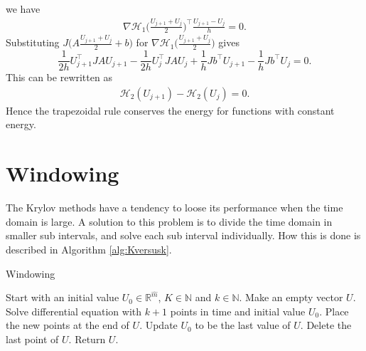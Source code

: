 \noindent we have
\begin{equation*}
\begin{aligned}
\nabla \mathcal{H}_1 \Big(\frac{U_{j+1}  + U_j}{2} \Big) ^\top \frac{U_{j+1} - U_j}{ h } = 0.
\end{aligned}
\end{equation*}
\noindent Substituting $ J \Big( A\frac{U_{j+1}  + U_j}{2}  + b \Big) $ for $\nabla \mathcal{H}_1 \Big( \frac{U_{j+1}  + U_j}{2} \Big)$ gives
\begin{equation*}
\frac{1}{2 h} U_{j+1}^\top JAU_{j+1} %
- \frac{1}{2 h} U_{j}^\top JAU_{j} + \frac{1}{h} Jb^\top U_{j+1} -\frac{1}{h} Jb^\top U_{j} = 0.
\end{equation*}
This can be rewritten as
\begin{equation*}
\begin{aligned}
\mathcal{H}_2(U_{j+1}) - \mathcal{H}_2(U_{j}) = 0.
\end{aligned}
\end{equation*}
\noindent Hence the trapezoidal rule conserves the energy for functions with constant energy. %

\section{Windowing}%
\label{sec:windu}
\noindent The Krylov methods have a tendency to loose its performance when the time domain is large. A solution to this problem is to divide the time domain in smaller sub intervals, and solve each sub interval individually. How this is done is described in Algorithm \ref{alg:Kversusk}.\\ 


\begin{algorithm} [h!]
\begin{algorithmic} \caption{ Windowing } \label{alg:Kversusk}  
\STATE Start with an initial value $U_0 \in \mathbb{R}^{\hat{m}}$, $K \in \mathbb{N}$ and $k \in \mathbb{N}$.
\STATE Make an empty vector $U$.
   \STATE Solve differential equation with $k+1$ points in time and initial value $U_0$.
   \STATE Place the new points at the end of $U$.
   \STATE Update $U_0$ to be the last value of $U$.
   \STATE Delete the last point of $U$.
\ENDFOR
\STATE Return $U$.
\end{algorithmic} 
\end{algorithm}


